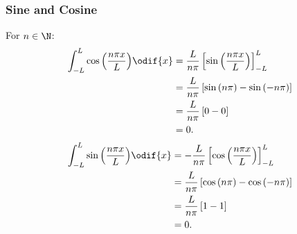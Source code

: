 \documentclass{article}
\begin{document}
\subsubsection{Sine and Cosine}
For \(n \in \N\):
\begin{align}
    \int_{-L}^L \cos{\left( \frac{n \pi x}{L} \right)} \odif{x} & = \frac{L}{n \pi} \left[ \sin{\left( \frac{n \pi x}{L} \right)} \right]_{-L}^L            \nonumber \\
                                                                & = \frac{L}{n \pi} \left[ \sin{\left( n \pi \right)} - \sin{\left( -n \pi \right)} \right] \nonumber \\
                                                                & = \frac{L}{n \pi} \left[ 0 - 0 \right]                                                    \nonumber \\
                                                                & = 0. \label{eq:cosine}
\end{align}
\begin{align}
    \int_{-L}^L \sin{\left( \frac{n \pi x}{L} \right)} \odif{x} & = -\frac{L}{n \pi} \left[ \cos{\left( \frac{n \pi x}{L} \right)} \right]_{-L}^L           \nonumber \\
                                                                & = \frac{L}{n \pi} \left[ \cos{\left( n \pi \right)} - \cos{\left( -n \pi \right)} \right] \nonumber \\
                                                                & = \frac{L}{n \pi} \left[ 1 - 1 \right]                                                    \nonumber \\
                                                                & = 0. \label{eq:sin}
\end{align}
\end{document}
